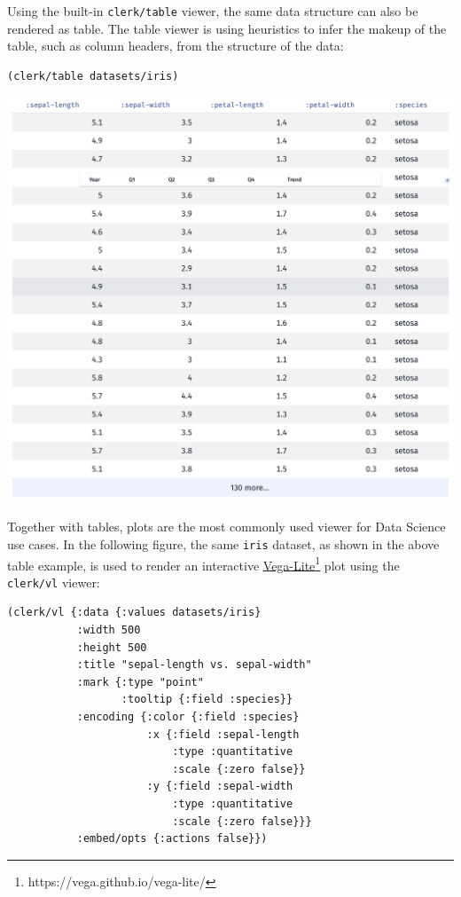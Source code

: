 \documentclass[sigconf,screen]{acmart}
\newcommand{\passthrough}[1]{#1}
\begin{document}
Using the built-in \passthrough{\lstinline!clerk/table!} viewer, the same data structure can also be rendered as table. The table viewer is using heuristics to infer the makeup of the table, such as column headers, from the structure of the data:

\begin{minipage}{\linewidth}
\begin{lstlisting}
(clerk/table datasets/iris)
\end{lstlisting}
\end{minipage}

\includegraphics{images/anon-expr-5dtuc4aWdsThsN1ZehoANzcdjAoyh5-result.png}

Together with tables, plots are the most commonly used viewer for Data Science use cases. In the following figure, the same \passthrough{\lstinline!iris!} dataset, as shown in the above table example, is used to render an interactive {\href{https://vega.github.io/vega-lite/}{Vega-Lite}\footnote{https://vega.github.io/vega-lite/}} plot using the \passthrough{\lstinline!clerk/vl!} viewer:

\begin{minipage}{\linewidth}
\begin{lstlisting}
(clerk/vl {:data {:values datasets/iris}
           :width 500
           :height 500
           :title "sepal-length vs. sepal-width"
           :mark {:type "point"
                  :tooltip {:field :species}}
           :encoding {:color {:field :species}
                      :x {:field :sepal-length
                          :type :quantitative
                          :scale {:zero false}}
                      :y {:field :sepal-width
                          :type :quantitative
                          :scale {:zero false}}}
           :embed/opts {:actions false}})
\end{lstlisting}
\end{minipage}
\end{document}

